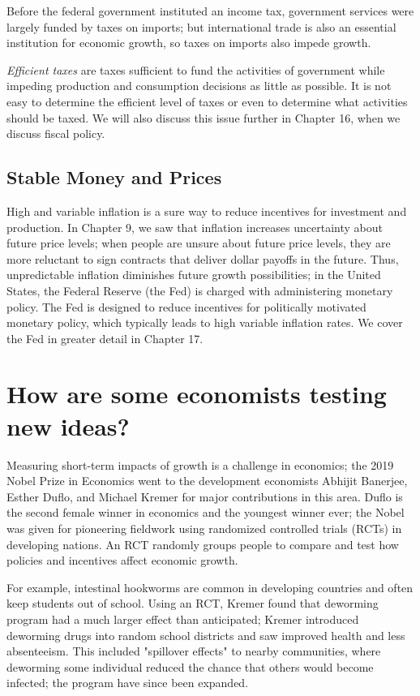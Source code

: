 \documentclass[11pt]{article} %
\begin{document}
Before the federal government instituted an income tax, government services were largely funded by taxes on imports; but international trade is also an essential institution for economic growth, so taxes on imports also impede growth.

\textit{Efficient taxes} are taxes sufficient to fund the activities of government while impeding production and consumption decisions as little as possible. It is not easy to determine the efficient level of taxes or even to determine what activities should be taxed. We will also discuss this issue further in Chapter 16, when we discuss fiscal policy.

\subsection*{Stable Money and Prices}

High and variable inflation is a sure way to reduce incentives for investment and production. In Chapter 9, we saw that inflation increases uncertainty about future price levels; when people are unsure about future price levels, they are more reluctant to sign contracts that deliver dollar payoffs in the future. Thus, unpredictable inflation diminishes future growth possibilities; in the United States, the Federal Reserve (the Fed) is charged with administering monetary policy. The Fed is designed to reduce incentives for politically motivated monetary policy, which typically leads to high variable inflation rates. We cover the Fed in greater detail in Chapter 17.

\section*{\textbf{How are some economists testing new ideas?}}

Measuring short-term impacts of growth is a challenge in economics; the 2019 Nobel Prize in Economics went to the development economists Abhijit Banerjee, Esther Duflo, and Michael Kremer for major contributions in this area. Duflo is the second female winner in economics and the youngest winner ever; the Nobel was given for pioneering fieldwork using randomized controlled trials (RCTs) in developing nations. An RCT randomly groups people to compare and test how policies and incentives affect economic growth.

For example, intestinal hookworms are common in developing countries and often keep students out of school. Using an RCT, Kremer found that deworming program had a much larger effect than anticipated; Kremer introduced deworming drugs into random school districts and saw improved health and less absenteeism. This included "spillover effects" to nearby communities, where deworming some individual reduced the chance that others would become infected; the program have since been expanded.
\end{document}
